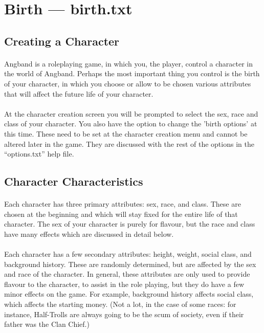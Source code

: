 \section{Birth --- birth.txt}
\subsection{Creating a Character}
\paragraph{}
Angband is a roleplaying game, in which you, the player, control a
character in the world of Angband. Perhaps the most important thing you
control is the birth of your character, in which you choose or allow to
be chosen various attributes that will affect the future life of your
character.

\paragraph{}
At the character creation screen you will be prompted to select the sex,
race and class of your character. You also have the option to change
the 'birth options' at this time. These need to be set at the character
creation menu and cannot be altered later in the game. They are
discussed with the rest of the options in the ``options.txt'' help file.


\subsection{Character Characteristics}
\paragraph{}
Each character has three primary attributes: sex, race, and class. These
are chosen at the beginning and which will stay fixed for the entire
life of that character. The sex of your character is purely for
flavour, but the race and class have many effects which are discussed in
detail below.

\paragraph{}
Each character has a few secondary attributes: height, weight, social
class, and background history. These are randomly determined, but are
affected by the sex and race of the character. In general, these
attributes are only used to provide flavour to the character, to assist
in the role playing, but they do have a few minor effects on the game.
For example, background history affects social class, which affects the
starting money. (Not a lot, in the case of some races: for instance,
Half-Trolls are always going to be the scum of society, even if their
father was the Clan Chief.)

